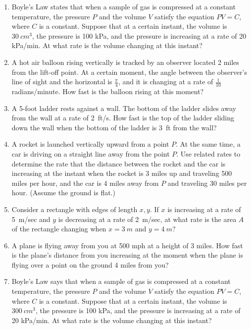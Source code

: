 \documentclass[10pt]{scrartcl}
\theoremstyle{definition}
\begin{document}
\begin{enumerate}
\item[2019 Fall Final \#10] Boyle's Law states that when a sample of gas is compressed at a constant temperature, the pressure $P$ and the volume $V$ satisfy the equation $PV = C$, where $C$ is a constant. Suppose that at a certain instant, the volume is $\SI{30}{cm^3}$, the pressure is 100 kPa, and the pressure is increasing at a rate of 20 kPa/min. At what rate is the volume changing at this instant?
\item[2018 Fall Exam 2] A hot air balloon rising vertically is tracked by an observer located 2 miles from the lift-off point. At a certain moment, the angle between the observer's line of sight and the horizontal is $\tfrac\pi4$, and it is changing at a rate of $\tfrac{1}{10}$ radians/minute. How fast is the balloon rising at this moment?
\item[2018 Fall Final] A 5-foot ladder rests against a wall. The bottom of the ladder slides away from the wall at a rate of \SI{2}{ft/s}. How fast is the top of the ladder sliding down the wall when the bottom of the ladder is \SI{3}{ft} from the wall?
\item[2017 Fall Exam 2] A rocket is launched vertically upward from a point $P$. At the same time, a car is driving on a straight line away from the point $P$. Use related rates to determine the rate that the distance between the rocket and the car is increasing at the instant when the rocket is 3 miles up and traveling 500 miles per hour, and the car is 4 miles away from $P$ and traveling 30 miles per hour. (Assume the ground is flat.)
\item[2017 Fall Final] Consider a rectangle with edges of length $x, y$. If $x$ is increasing at a rate of \SI{5}{m/sec} and $y$ is decreasing at a rate of \SI{2}{m/sec}, at what rate is the area $A$ of the rectangle changing when $x = \SI{3}{m}$ and $y = \SI{4}{m}$?
\item[2017 Summer Exam 2] A plane is flying away from you at 500 mph at a height of 3 miles. How fast is the plane's distance from you increasing at the moment when the plane is flying over a point on the ground 4 miles from you?
\item[2017 Spring Exam 2] Boyle's Law says that when a sample of gas is compressed at a constant temperature, the pressure $P$ and the volume $V$ satisfy the equation $PV = C$, where $C$ is a constant. Suppose that at a certain instant, the volume is $\SI{300}{cm^3}$, the pressure is 100 kPa, and the pressure is increasing at a rate of 20 kPa/min. At what rate is the volume changing at this instant?

\end{enumerate}
\end{document}
